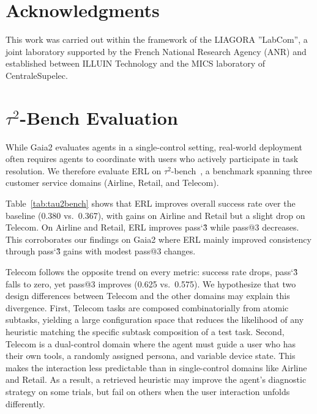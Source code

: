 \documentclass{article}
\begin{document}
\section*{Acknowledgments}

This work was carried out within the framework of the LIAGORA ”LabCom”, a joint laboratory supported by the French National Research Agency (ANR) and established between ILLUIN Technology and the MICS laboratory of CentraleSupelec.




\newpage

\appendix

\section{$\tau^2$-Bench Evaluation}
While Gaia2 evaluates agents in a single-control setting, real-world deployment often requires agents
to coordinate with users who actively participate in task resolution. We therefore evaluate ERL on
$\tau^2$-bench~\citep{barres2025tau2benchevaluatingconversationalagents}, a benchmark spanning three customer service domains (Airline, Retail, and Telecom).

Table~\ref{tab:tau2bench} shows that ERL improves overall success rate over the baseline (0.380 vs.\ 0.367), with gains on Airline and Retail but a slight drop on Telecom. On Airline and Retail, ERL improves pass\char`\^3 while pass@3 decreases. This corroborates our findings on Gaia2 where ERL mainly improved consistency through pass\char`\^3 gains with modest pass@3 changes.

Telecom follows the opposite trend on every metric: success rate drops, pass\char`\^3 falls to zero, yet pass@3 improves (0.625 vs.\ 0.575). We hypothesize that two design differences between Telecom and the other domains may explain this divergence. First, Telecom tasks are composed combinatorially from atomic subtasks, yielding a large configuration space that reduces the likelihood of any heuristic matching the specific subtask composition of a test task. Second, Telecom is a dual-control domain where the agent must guide a user who has their own tools, a randomly assigned persona, and variable device state. This makes the interaction less predictable than in single-control domains like Airline and Retail. As a result, a retrieved heuristic may improve the agent's diagnostic strategy on some trials, but fail on others when the user interaction unfolds differently.
\end{document}
